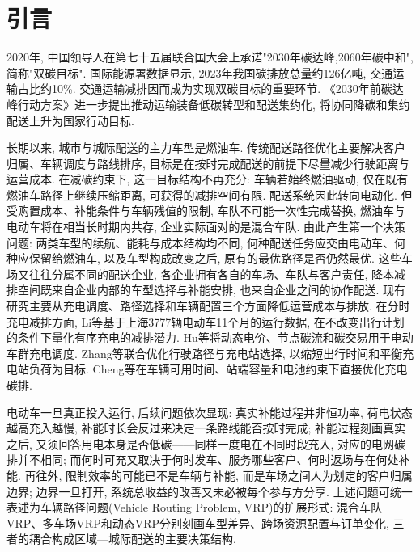 \documentclass{setp-new}
\begin{document}
\maketitle
\clearpage


\section{引言}

2020年, 中国领导人在第七十五届联合国大会上承诺"2030年碳达峰,2060年碳中和", 简称"双碳目标".
国际能源署数据显示, 2023年我国碳排放总量约126亿吨, 交通运输占比约10\%.
交通运输减排因而成为实现双碳目标的重要环节.
《2030年前碳达峰行动方案》进一步提出推动运输装备低碳转型和配送集约化\cite{ref:55},
将协同降碳和集约配送上升为国家行动目标.

长期以来, 城市与城际配送的主力车型是燃油车.
传统配送路径优化主要解决客户归属、车辆调度与路线排序,
目标是在按时完成配送的前提下尽量减少行驶距离与运营成本.
在减碳约束下, 这一目标结构不再充分: 车辆若始终燃油驱动,
仅在既有燃油车路径上继续压缩距离, 可获得的减排空间有限.
配送系统因此转向电动化.
但受购置成本、补能条件与车辆残值的限制, 车队不可能一次性完成替换,
燃油车与电动车将在相当长时期内共存, 企业实际面对的是混合车队.
由此产生第一个决策问题: 两类车型的续航、能耗与成本结构均不同,
何种配送任务应交由电动车、何种应保留给燃油车,
以及车型构成改变之后, 原有的最优路径是否仍然最优.
这些车场又往往分属不同的配送企业, 各企业拥有各自的车场、车队与客户责任,
降本减排空间既来自企业内部的车型选择与补能安排, 也来自企业之间的协作配送.
现有研究主要从充电调度、路径选择和车辆配置三个方面降低运营成本与排放.
在分时充电减排方面, Li等\cite{ref:52}基于上海3777辆电动车11个月的运行数据,
在不改变出行计划的条件下量化有序充电的减排潜力.
Hu等\cite{ref:53}将动态电价、节点碳流和碳交易用于电动车群充电调度.
Zhang等\cite{ref:54}联合优化行驶路径与充电站选择, 以缩短出行时间和平衡充电站负荷为目标.
Cheng等\cite{ref:50}在车辆可用时间、站端容量和电池约束下直接优化充电碳排.

电动车一旦真正投入运行, 后续问题依次显现:
真实补能过程并非恒功率, 荷电状态越高充入越慢, 补能时长会反过来决定一条路线能否按时完成;
补能过程刻画真实之后, 又须回答用电本身是否低碳——同样一度电在不同时段充入, 对应的电网碳排并不相同;
而何时可充又取决于何时发车、服务哪些客户、何时返场与在何处补能.
再往外, 限制效率的可能已不是车辆与补能, 而是车场之间人为划定的客户归属边界;
边界一旦打开, 系统总收益的改善又未必被每个参与方分享.
上述问题可统一表述为车辆路径问题(Vehicle Routing Problem, VRP)的扩展形式:
混合车队VRP、多车场VRP和动态VRP分别刻画车型差异、跨场资源配置与订单变化,
三者的耦合构成区域—城际配送的主要决策结构.
\end{document}
